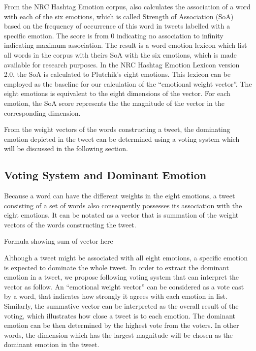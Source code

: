 From the NRC Hashtag Emotion corpus, \citet{mohammad2012emotional} also calculates the association of a word with each of the six emotions, which is called Strength of Association (SoA) based on the frequency of occurrence of this word in tweets labelled with a specific emotion. The score is from 0 indicating no association to infinity indicating maximum association. The result is a word emotion lexicon which list all words in the corpus with theirs SoA with the six emotions, which is made available for research purposes. In the NRC Hashtag Emotion Lexicon version 2.0, the SoA is calculated to Plutchik's eight emotions. This lexicon can be employed as the baseline for our calculation of the ``emotional weight vector''. The eight emotions is equivalent to the eight dimensions of the vector. For each emotion, the SoA score represents the the magnitude of the vector in the corresponding dimension.

From the weight vectors of the words constructing a tweet, the dominating emotion depicted in the tweet can be determined using a voting system which will be discussed in the following section.

\subsection{Voting System and Dominant Emotion}
Because a word can have the different weights in the eight emotions, a tweet consisting of a set of words also consequently possesses its association with the eight emotions. It can be notated as a vector that is summation of the weight vectors of the words constructing the tweet.

Formula showing sum of vector here

Although a tweet might be associated with all eight emotions, a specific emotion is expected to dominate the whole tweet. In order to extract the dominant emotion in a tweet, we propose following voting system that can interpret the vector as follow. An ``emotional weight vector'' can be considered as a vote cast by a word, that indicates how strongly it agrees with each emotion in list. Similarly, the summative vector can be interpreted as the overall result of the voting, which illustrates how close a tweet is to each emotion. The dominant emotion can be then determined by the highest vote from the voters. In other words, the dimension which has the largest magnitude will be chosen as the dominant emotion in the tweet.

